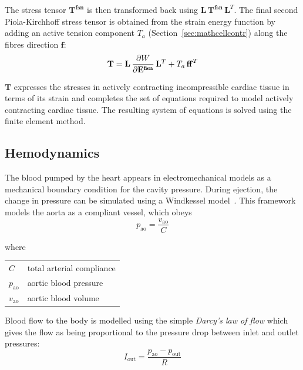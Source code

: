 \noindent
The stress tensor $\mathbf{T^{fsn}}$ is then transformed back using $\mathbf{L}\,\mathbf{T^{fsn}}\,\mathbf{L}^T$. The final second Piola-Kirchhoff stress tensor is obtained from the strain energy function by adding an active tension component $T_a$ (Section~\ref{sec:mathcellcontr}) along the fibres direction $\mathbf{f}$:
%
\begin{equation}\label{eq:eqce}
    \mathbf{T} = \mathbf{L}\,\dfrac{\partial {W}}{\partial {\mathbf{E^{fsn}}}}\,\mathbf{L}^T + T_a\,\mathbf{ff}^T
\end{equation}

\noindent
$\mathbf{T}$ expresses the stresses in actively contracting incompressible cardiac tissue in terms of its strain and completes the set of equations required to model actively contracting cardiac tissue. The resulting system of equations is solved using the finite element method.


%
%
%
\subsection{Hemodynamics}\label{sec:hemodynamics_math_modelling}
The blood pumped by the heart appears in electromechanical models as a mechanical boundary condition for the cavity pressure. During ejection, the change in pressure can be simulated using a Windkessel model~\cite{Westerhof:1971}. This framework models the aorta as a compliant vessel, which obeys
%
\begin{equation}\label{eq:firstwkelem}
    p_{\textrm{ao}} = \frac{v_{\textrm{ao}}}{C}
\end{equation}

\noindent
where

\vspace{0.2cm}
\begin{tabular}{ll}
    $C$ & total arterial compliance \\
    $p_{\textrm{ao}}$ & aortic blood pressure \\
    $v_{\textrm{ao}}$ & aortic blood volume \\
\end{tabular}

\vspace{0.5cm}
\noindent
Blood flow to the body is modelled using the simple \textit{Darcy's law of flow} which gives the flow as being proportional to the pressure drop between inlet and outlet pressures:
%
\begin{equation}\label{eq:secondwkelem}
    I_{\textrm{out}} = \frac{p_{\textrm{ao}}-p_{\textrm{out}}}{R} 
\end{equation}


